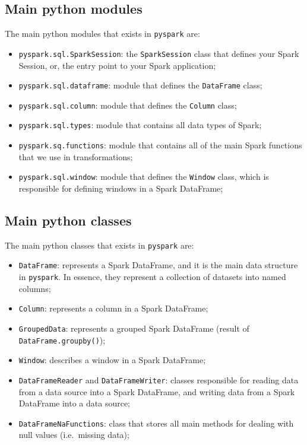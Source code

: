 \documentclass[
  11pt,
  letterpaper,
  DIV=11,
  numbers=noendperiod]{scrreprt}
\providecommand{\tightlist}{%
  \setlength{\itemsep}{0pt}\setlength{\parskip}{0pt}}\usepackage{longtable,booktabs,array}
\begin{document}
\hypertarget{main-python-modules}{%
\subsection{Main python modules}\label{main-python-modules}}

The main python modules that exists in \texttt{pyspark} are:

\begin{itemize}
\tightlist
\item
  \texttt{pyspark.sql.SparkSession}: the \texttt{SparkSession} class
  that defines your Spark Session, or, the entry point to your Spark
  application;
\item
  \texttt{pyspark.sql.dataframe}: module that defines the
  \texttt{DataFrame} class;
\item
  \texttt{pyspark.sql.column}: module that defines the \texttt{Column}
  class;
\item
  \texttt{pyspark.sql.types}: module that contains all data types of
  Spark;
\item
  \texttt{pyspark.sq.functions}: module that contains all of the main
  Spark functions that we use in transformations;
\item
  \texttt{pyspark.sql.window}: module that defines the \texttt{Window}
  class, which is responsible for defining windows in a Spark DataFrame;
\end{itemize}

\hypertarget{main-python-classes}{%
\subsection{Main python classes}\label{main-python-classes}}

The main python classes that exists in \texttt{pyspark} are:

\begin{itemize}
\item
  \texttt{DataFrame}: represents a Spark DataFrame, and it is the main
  data structure in \texttt{pyspark}. In essence, they represent a
  collection of datasets into named columns;
\item
  \texttt{Column}: represents a column in a Spark DataFrame;
\item
  \texttt{GroupedData}: represents a grouped Spark DataFrame (result of
  \texttt{DataFrame.groupby()});
\item
  \texttt{Window}: describes a window in a Spark DataFrame;
\item
  \texttt{DataFrameReader} and \texttt{DataFrameWriter}: classes
  responsible for reading data from a data source into a Spark
  DataFrame, and writing data from a Spark DataFrame into a data source;
\item
  \texttt{DataFrameNaFunctions}: class that stores all main methods for
  dealing with null values (i.e.~missing data);
\end{itemize}
\end{document}
